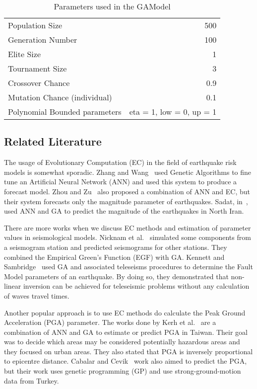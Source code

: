 \begin{table}[H]
  \caption{Parameters used in the GAModel}
  \label{GAParameters5.1}
  \begin{center}
    \begin{tabular}{|l|r|}
      \hline
      Population Size & 500\\
      Generation Number & 100\\
      Elite Size & 1\\
      Tournament Size & 3\\
      Crossover Chance & 0.9\\
      Mutation Chance (individual) & 0.1\\
      Polynomial Bounded parameters & eta = 1, low = 0, up = 1\\
      \hline    
    \end{tabular}
  \end{center}
\end{table}

\subsection{Related Literature}

The usage of Evolutionary Computation (EC) in the field of earthquake
risk models is somewhat sporadic. Zhang and Wang~\cite{Zhang2012} used
Genetic Algorithms to fine tune an Artificial Neural Network (ANN) and
used this system to produce a forecast model. Zhou and
Zu~\cite{Feiyan2014} also proposed a combination of ANN and EC, but
their system forecasts only the magnitude parameter of
earthquakes. Sadat, in~\cite{sadat2015application}, used ANN and GA to
predict the magnitude of the earthquakes in North Iran.

There are more works when we discuss EC methods and estimation of
parameter values in seismological models. Nicknam et
al.~\cite{Nicknam2010} simulated some components from a seismogram
station and predicted seismograms for other stations. They combined
the Empirical Green’s Function (EGF) with GA. Kennett and
Sambridge~\cite{Kennett1992} used GA and associated teleseisms
procedures to determine the Fault Model parameters of an
earthquake. By doing so, they demonstrated that non-linear inversion
can be achieved for teleseismic problems without any calculation of
waves travel times.

Another popular approach is to use EC methods do calculate the Peak
Ground Acceleration (PGA) parameter. The works done by Kerh et
al.~\cite{Kerh2010, Kerh2015} are a combination of ANN and GA to
estimate or predict PGA in Taiwan. Their goal was to decide which
areas may be considered potentially hazardous areas and they focused
on urban areas. They also stated that PGA is inversely proportional to
epicentre distance. Cabalar and Cevik~\cite{Cabalar2009} work also
aimed to predict the PGA, but their work uses genetic programming (GP)
and use strong-ground-motion data from Turkey.

